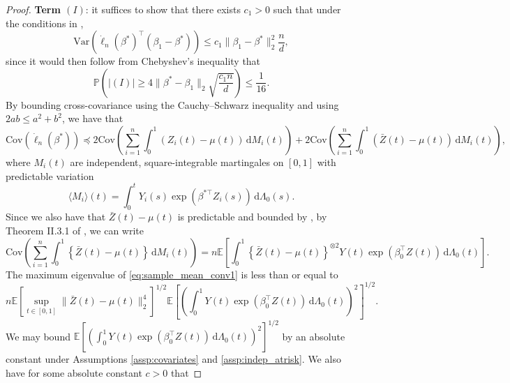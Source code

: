 \documentclass[11pt]{article}
\newcommand{\dint}{\,\mathrm{d}}
\begin{document}
\begin{proof}
\bigskip
\noindent \textbf{Term $(I)$}: it suffices to show that there exists $c_1>0$ such that under the conditions in ,  
\begin{equation}
\mathrm{Var}\left(\dot{\ell}_n(\beta^*)^\top(\beta_1-\beta^*) \right) \leq c_1\|\beta_1-\beta^*\|_2^2 \frac{n}{d},
\label{eq:score_var}
\end{equation}
since it would then follow from Chebyshev's inequality that 
\begin{equation}
    \mathbb{P}\left( |(I)| \geq 4\|\beta^*-\beta_1\|_2 \sqrt{\frac{c_1n}{d}}\right) \leq \frac{1}{16}.
    \label{eq:binary_martingale}
\end{equation}
By bounding cross-covariance using the Cauchy--Schwarz inequality and using $2ab \leq a^2 + b^2$, we have that 
\begin{equation}
    \mathrm{Cov}(\dot{\ell}_n(\beta^*)) \preceq 2\mathrm{Cov}\left(\sum_{i=1}^n \int_0^1 (Z_i(t) - \mu(t) ) \dint M_i(t)\right) + 2\mathrm{Cov}\left(\sum_{i=1}^n \int_0^1 (\bar{Z}(t) - \mu(t)) \dint M_i(t) \right), 
    \label{eqref:loglik-covariance}
\end{equation}
where $M_i(t)$ are independent, square-integrable martingales on $[0, 1]$ with predictable variation 
\begin{equation*}
    \langle M_i\rangle(t) = \int_0^t Y_i(s) \exp(\beta^{*\top}Z_i(s)) \dint \Lambda_0(s). 
\end{equation*} 
Since we also have that $\bar{Z}(t) - \mu(t)$ is predictable and bounded by , by Theorem II.3.1 of \citealp{andersen1993statistical}, we can write  
\begin{equation}   
\mathrm{Cov}\left(\sum_{i=1}^n \int_0^1 \left\{\bar{Z}(t) - \mu(t) \right\} \dint M_i(t) \right) = n\mathbb{E} \left[\int_0^1 \left\{\bar{Z}(t) - \mu(t)\right\}^{\otimes 2} Y(t) \exp(\beta_0^\top Z(t)) \dint \Lambda_0(t) \right].   \label{eq:sample_mean_conv1}
\end{equation}
 The maximum eigenvalue of \eqref{eq:sample_mean_conv1} is less than or equal to 
\begin{equation}
    n\mathbb{E} \left[ \sup_{t \in [0, 1]} \|\bar{Z}(t) - \mu(t)\|_2^4\right]^{1/2} \mathbb{E} \left[  \left(\int_0^1 Y(t) \exp(\beta_0^\top Z(t)) \dint \Lambda_0(t) \right)^2 \right]^{1/2}.
    \label{eq:sample_mean_conv2}
\end{equation}
We may bound $\mathbb{E} \left[  \left(\int_0^1 Y(t) \exp(\beta_0^\top Z(t)) \dint \Lambda_0(t) \right)^2 \right]^{1/2}$ by an absolute constant under Assumptions \ref{assp:covariates} and \ref{assp:indep_atrisk}. We also have for some absolute constant $c>0$ that

\end{proof}
\end{document}
